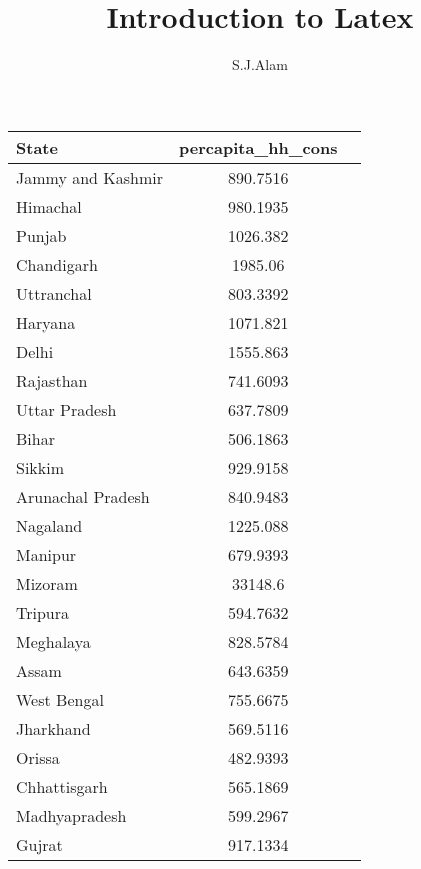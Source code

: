\documentclass[12pt]{article}
\author{S.J.Alam}
\title{Introduction to Latex}
\begin{document}
\begin{table}[htbp]\centering
{
\def\sym#1{\ifmmode^{#1}\else\(^{#1}\)\fi}
\begin{tabular}{l*{1}{cc}}
\hline\hline
                            State  &       percapita\_hh\_cons\\
\hline
Jammy and Kashmir             &               890.7516\\
Himachal                      &               980.1935\\
Punjab                        &              1026.382\\
Chandigarh                    &                1985.06\\
Uttranchal                    &               803.3392\\
Haryana                       &               1071.821\\
Delhi                         &               1555.863\\
Rajasthan                     &               741.6093\\
Uttar Pradesh                 &               637.7809\\
Bihar                         &              506.1863\\
Sikkim                        &              929.9158\\
Arunachal Pradesh             &              840.9483\\
Nagaland                      &              1225.088\\
Manipur                       &              679.9393\\
Mizoram                       &               33148.6\\
Tripura                       &              594.7632\\
Meghalaya                     &              828.5784\\
Assam                         &              643.6359\\
West Bengal                   &              755.6675\\
Jharkhand                     &              569.5116\\
Orissa                        &              482.9393\\
Chhattisgarh                  &              565.1869\\
Madhyapradesh                 &              599.2967\\
Gujrat                        &              917.1334\\

\end{tabular}}
\end{table}
\end{document}

